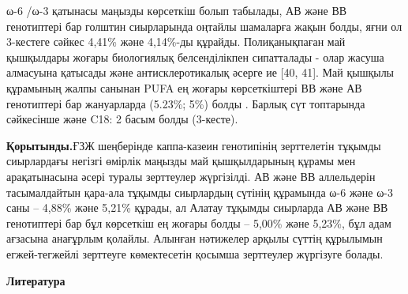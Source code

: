 \begin{multicols}{2}
  ω-6 /ω-3 қатынасы маңызды көрсеткіш болып табылады, АВ және ВВ
  генотиптері бар голштин сиырларында оңтайлы шамаларға жақын болды, яғни
  ол 3-кестеге сәйкес 4,41\% және 4,14\%-ды құрайды. Полиқанықпаған май
  қышқылдары жоғары биологиялық белсенділікпен сипатталады - олар жасуша
  алмасуына қатысады және антисклеротикалық әсерге ие {[}40, 41{]}. Май
  қышқылы құрамының жалпы санынан PUFA ең жоғары көрсеткіштері ВВ және АВ
  генотиптері бар жануарларда (5.23\%; 5\%) болды . Барлық сүт топтарында
  сәйкесінше және C18: 2 басым болды (3-кесте).

  
{\bfseries Қорытынды.}ҒЗЖ шеңберінде каппа-казеин генотипінің зерттелетін
тұқымды сиырлардағы негізгі өмірлік маңызды май қышқылдарының құрамы мен
арақатынасына әсері туралы зерттеулер жүргізілді. АВ және ВВ аллельдерін
тасымалдайтын қара-ала тұқымды сиырлардың сүтінің құрамында ω-6 және ω-3
саны -- 4,88\% және 5,21\% құрады, ал Алатау тұқымды сиырларда АВ және
ВВ генотиптері бар бұл көрсеткіш ең жоғары болды -- 5,00\% және 5,23\%,
бұл адам ағзасына анағұрлым қолайлы. Алынған нәтижелер арқылы сүттің
құрылымын егжей-тегжейлі зерттеуге көмектесетін қосымша зерттеулер
жүргізуге болады.
\end{multicols}


\begin{center}
  {\bfseries Литература}
  \end{center}

